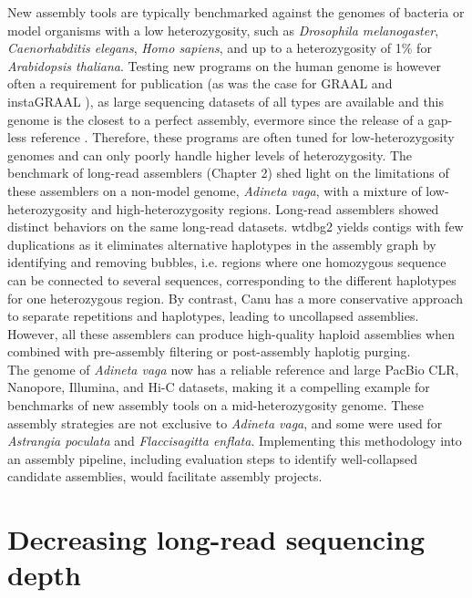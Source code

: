 New assembly tools are typically benchmarked against the genomes of bacteria or model organisms with a low heterozygosity, such as \textit{Drosophila melanogaster}, \textit{Caenorhabditis elegans}, \textit{Homo sapiens}, and up to a heterozygosity of 1\% for \textit{Arabidopsis thaliana}. Testing new programs on the human genome is however often a requirement for publication (as was the case for GRAAL \cite{graal} and instaGRAAL \cite{instagraal}), as large sequencing datasets of all types are available and this genome is the closest to a perfect assembly, evermore since the release of a gap-less reference \cite{complete_human}. Therefore, these programs are often tuned for low-heterozygosity genomes and can only poorly handle higher levels of heterozygosity. The benchmark of long-read assemblers (Chapter 2) shed light on the limitations of these assemblers on a non-model genome, \textit{Adineta vaga}, with a mixture of low-heterozygosity and high-heterozygosity regions. Long-read assemblers showed distinct behaviors on the same long-read datasets. wtdbg2 yields contigs with few duplications as it eliminates alternative haplotypes in the assembly graph by identifying and removing bubbles, i.e. regions where one homozygous sequence can be connected to several sequences, corresponding to the different haplotypes for one heterozygous region. By contrast, Canu has a more conservative approach to separate repetitions and haplotypes, leading to uncollapsed assemblies. However, all these assemblers can produce high-quality haploid assemblies when combined with pre-assembly filtering or post-assembly haplotig purging. \\

The genome of \textit{Adineta vaga} now has a reliable reference and large PacBio CLR, Nanopore, Illumina, and Hi-C datasets, making it a compelling example for benchmarks of new assembly tools on a mid-heterozygosity genome. These assembly strategies are not exclusive to \textit{Adineta vaga}, and some were used for \textit{Astrangia poculata} and \textit{Flaccisagitta enflata}. Implementing this methodology into an assembly pipeline, including evaluation steps to identify well-collapsed candidate assemblies, would facilitate assembly projects. \\

\section{Decreasing long-read sequencing depth}

